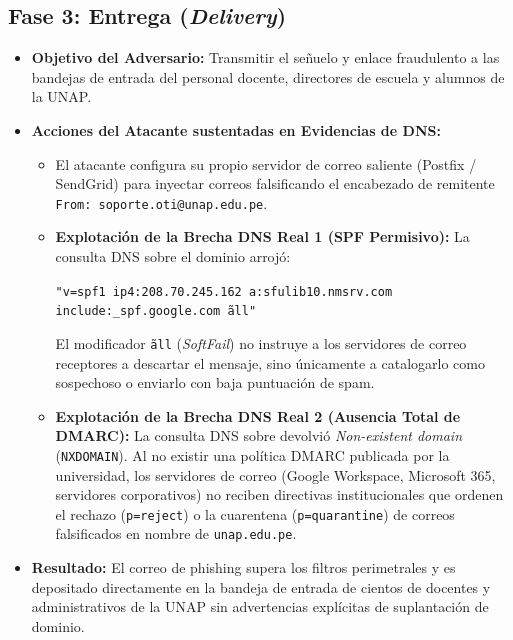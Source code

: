 \subsection*{Fase 3: Entrega (\textit{Delivery})}
\begin{itemize}
    \item \textbf{Objetivo del Adversario:} Transmitir el señuelo y enlace fraudulento a las bandejas de entrada del personal docente, directores de escuela y alumnos de la UNAP.
    \item \textbf{Acciones del Atacante sustentadas en Evidencias de DNS:}
    \begin{itemize}
        \item El atacante configura su propio servidor de correo saliente (Postfix / SendGrid) para inyectar correos falsificando el encabezado de remitente \texttt{From:\allowbreak\ soporte.oti@\allowbreak unap.edu.pe}.
        \item \textbf{Explotación de la Brecha DNS Real 1 (SPF Permisivo):} La consulta DNS sobre el dominio arrojó:
        \begin{center}
        \small\texttt{"v=spf1 ip4:208.70.245.162 a:sfulib10.nmsrv.com include:\_spf.google.com \~all"}
        \end{center}
        El modificador \texttt{\~all} (\textit{SoftFail}) no instruye a los servidores de correo receptores a descartar el mensaje, sino únicamente a catalogarlo como sospechoso o enviarlo con baja puntuación de spam.
        \item \textbf{Explotación de la Brecha DNS Real 2 (Ausencia Total de DMARC):} La consulta DNS sobre  devolvió \textit{Non-existent domain} (\texttt{NXDOMAIN}). Al no existir una política DMARC publicada por la universidad, los servidores de correo (Google Workspace, Microsoft 365, servidores corporativos) no reciben directivas institucionales que ordenen el rechazo (\texttt{p=reject}) o la cuarentena (\texttt{p=quarantine}) de correos falsificados en nombre de \texttt{unap.edu.pe}.
    \end{itemize}
    \item \textbf{Resultado:} El correo de phishing supera los filtros perimetrales y es depositado directamente en la bandeja de entrada de cientos de docentes y administrativos de la UNAP sin advertencias explícitas de suplantación de dominio.
\end{itemize}


